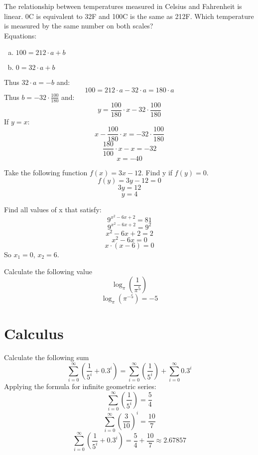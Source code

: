 \documentclass[10pt]{article}
\newenvironment{problem}[2][Problem]{\begin{trivlist}
\item[\hskip \labelsep {\bfseries #1}\hskip \labelsep {\bfseries #2.}]}{\end{trivlist}}
\begin{document}
\begin{problem}{2.1 (Based on SYD 2.5.6)}
The relationship between temperatures measured in Celsius and Fahrenheit is linear. 0\degree C is equivalent to 32\degree F and 100\degree C is the same as 212\degree F.
 Which temperature is measured by the same number on both scales? 
\medskip \\
Equations:
\begin{enumerate}[(a)]
	\item $100 = 212 \cdot a + b$
	\item $0 = 32 \cdot a + b$
\end{enumerate}
Thus $32 \cdot a = -b$ and:
$$ 100 = 212\cdot a - 32\cdot a = 180\cdot a$$
Thus $b = -32\cdot \frac{100}{180}$ and:
$$ y = \frac{100}{180} \cdot x - 32\cdot \frac{100}{180}$$
If $y = x$:
$$ x - \frac{100}{180}\cdot x = -32\cdot \frac{100}{180}$$
$$ \frac{180}{100}\cdot x - x = -32 $$
$$ x = -40$$
 
\end{problem}

\begin{problem}{2.2}
Take the following function $f(x)=3x-12$. Find y if $f(y)=0$.
$$f(y) = 3y-12 = 0$$
$$3y = 12$$
$$y = 4$$
\end{problem}

\begin{problem}{2.3}
Find all values of x that satisfy:
$$9^{x^2-6x+2}=81$$
$$9^{x^2-6x+2} = 9^2$$
$$x^2-6x+2 = 2$$
$$x^2-6x = 0$$
$$x\cdot (x-6) = 0$$
So $x_1 = 0$, $x_2 = 6$.
\end{problem}


\begin{problem}{2.5}
Calculate the following value
$$\log_{\pi}\left(\frac{1}{\pi^5} \right)$$
$$\log_{\pi}\left(\pi^{-5} \right) = -5 $$
\end{problem}

\section{Calculus}

\begin{problem}{3.1}
Calculate the following sum
$$\sum\limits_{i=0}^{\infty} \left( \frac{1}{5^i}+0.3^i\right) = \sum\limits_{i=0}^{\infty} \left( \frac{1}{5^i}\right) + \sum\limits_{i=0}^{\infty} 0.3^i$$
Applying the formula for infinite geometric series:
$$\sum\limits_{i=0}^{\infty} \left( \frac{1}{5^i}\right) = \frac{5}{4}$$
$$\sum\limits_{i=0}^{\infty} \left( \frac{3}{10} \right)^i = \frac{10}{7}$$
$$\sum\limits_{i=0}^{\infty} \left( \frac{1}{5^i}+0.3^i\right) = \frac{5}{4}+\frac{10}{7} \approx 2.67857$$
\end{problem}
\end{document}
